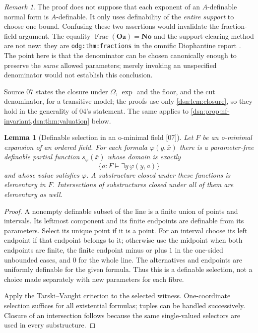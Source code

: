 \documentclass[11pt,a4paper]{article}
\numberwithin{equation}{section}
\newtheorem{lemma}[lemma]{Lemma}
\theoremstyle{definition}
\theoremstyle{remark}
\newtheorem{remark}[remark]{Remark}
\newcommand{\No}{\mathbf{No}}
\newcommand{\Oz}{\mathbf{Oz}}
\newcommand{\Frac}{\operatorname{Frac}}
\newcommand{\src}[1]{\textup{\textsf{\small[#1]}}}
\newcommand{\lbl}[1]{\nolinkurl{#1}}
\begin{document}
\begin{remark}
The proof does not suppose that each exponent of an $A$-definable
normal form is $A$-definable. It only uses definability of the
\emph{entire support} to choose one bound. Confusing these
two assertions would invalidate the fraction-field argument.
The equality $\Frac(\Oz)=\No$ and the support-clearing method are not
new: they are \lbl{odg:thm:fractions} in the omnific Diophantine report
\cite{RepoOdg}. The point here is that the denominator can be chosen
canonically enough to preserve the \emph{same} allowed parameters; merely
invoking an unspecified denominator would not establish this conclusion.
\end{remark}

Source 07 states the closure under $\Omega$, $\exp$ and the floor, and the
cut denominator, for a transitive model; the proofs use only
\cref{dsn:lem:closure}, so they hold in the generality of 04's statement.
The same applies to \cref{dsn:prop:nf-invariant,dsn:thm:valuation} below.

\begin{lemma}[Definable selection in an o-minimal field \src{07}]\label{dsn:lem:selection}
Let $F$ be an o-minimal expansion of an ordered field. For each formula
$\varphi(y,\bar x)$ there is a parameter-free definable partial function
$s_\varphi(\bar x)$ whose domain is exactly
\[
 \{\bar a:F\models\exists y\,\varphi(y,\bar a)\}
\]
and whose value satisfies $\varphi$. A substructure closed under these
functions is elementary in $F$. Intersections of substructures closed under
all of them are elementary as well.
\end{lemma}
\begin{proof}
A nonempty definable subset of the line is a finite union of points and
intervals. Its leftmost component and its finite endpoints are definable
from its parameters. Select its unique point if it is a point. For an
interval choose its left endpoint if that endpoint belongs to it;
otherwise use the midpoint when both endpoints are finite, the finite
endpoint minus or plus $1$ in the one-sided unbounded cases, and $0$ for
the whole line. The alternatives and endpoints are uniformly definable for
the given formula. Thus this is a definable selection, not a choice made
separately with new parameters for each fibre.

Apply the Tarski--Vaught criterion to the selected witness. One-coordinate
selection suffices for all existential formulas; tuples can be handled
successively. Closure of an intersection follows because the same
single-valued selectors are used in every substructure.
\end{proof}
\end{document}

